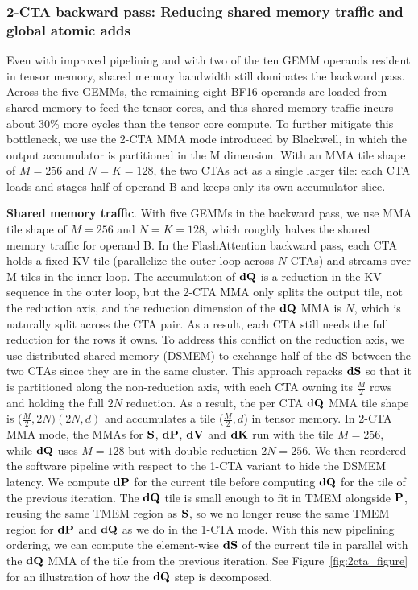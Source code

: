 \subsubsection{2-CTA backward pass: Reducing shared memory traffic and global atomic adds}

Even with improved pipelining and with two of the ten GEMM operands resident in tensor memory, shared memory bandwidth still dominates the backward pass. Across the five GEMMs, the remaining eight BF16 operands are loaded from shared memory to feed the tensor cores, and this shared memory traffic incurs about 30\% more cycles than the tensor core compute. To further mitigate this bottleneck, we use the 2-CTA MMA mode introduced by Blackwell, in which the output accumulator is partitioned in the M dimension. With an MMA tile shape of $M=256$ and $N=K=128$, the two CTAs act as a single larger tile: each CTA loads and stages half of operand B and keeps only its own accumulator slice.

\textbf{Shared memory traffic}. With five GEMMs in the backward pass, we use MMA tile shape of $M=256$ and $N=K=128$, which roughly halves the shared memory traffic for operand B. In the FlashAttention backward pass, each CTA holds a fixed KV tile (parallelize the outer loop across $N$ CTAs) and streams over M tiles in the inner loop. The accumulation of $\mathbf{dQ}$ is a reduction in the KV sequence in the outer loop, but the 2-CTA MMA only splits the output tile, not the reduction axis, and the reduction dimension of the $\mathbf{dQ}$ MMA is $N$, which is naturally split across the CTA pair. As a result, each CTA still needs the full reduction for the rows it owns. To address this conflict on the reduction axis, we use distributed shared memory (DSMEM) to exchange half of the dS between the two CTAs since they are in the same cluster.  This approach repacks $\mathbf{dS}$ so that it is partitioned along the non-reduction axis, with each CTA owning its $\frac{M}{2}$ rows and holding the full $2N$ reduction. As a result, the per CTA $\mathbf{dQ}$ MMA tile shape is ($\frac{M}{2}, 2N)(2N, d)$ and accumulates a tile ($\frac{M}{2}, d$) in tensor memory. In 2-CTA MMA mode, the MMAs for $\mathbf{S}$, $\mathbf{dP}$, $\mathbf{dV}$ and $\mathbf{dK}$ run with the tile $M=256$, while $\mathbf{dQ}$ uses $M=128$ but with double reduction $2N=256$.  We then reordered the software pipeline with respect to the 1-CTA variant to hide the DSMEM latency. We compute $\mathbf{dP}$ for the current tile before computing $\mathbf{dQ}$ for the tile of the previous iteration. The $\mathbf{dQ}$ tile is small enough to fit in TMEM alongside $\mathbf{P}$, reusing the same TMEM region as $\mathbf{S}$, so we no longer reuse the same TMEM region for $\mathbf{dP}$ and $\mathbf{dQ}$ as we do in the 1-CTA mode. With this new pipelining ordering, we can compute the element-wise $\mathbf{dS}$ of the current tile in parallel with the $\mathbf{dQ}$ MMA of the tile from the previous iteration. See Figure~\ref{fig:2cta_figure} for an illustration of how the $\mathbf{dQ}$ step is decomposed.

